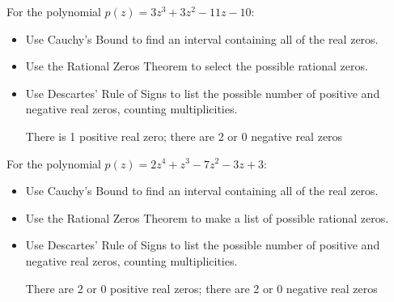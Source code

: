 \documentclass{ximera}
\begin{document}
\begin{problem}
For the polynomial $p(z) = 3z^{3} + 3z^{2} - 11z - 10$:

\begin{itemize}
\item  Use Cauchy's Bound to find an interval containing all of the real zeros.
\item  Use the Rational Zeros Theorem to select the possible rational zeros.
\begin{selectAll}
  \end{selectAll}
\item  Use Descartes' Rule of Signs to list the possible number of positive and negative real zeros, counting multiplicities.

\begin{solution}
    There is 1 positive real zero;  there are 2 or 0 negative real zeros
\end{solution}
\end{itemize}
\end{problem}

\begin{problem}\label{prelimpolystufflast}
For the polynomial $p(z) = 2z^4+z^3-7z^2-3z+3$:

\begin{itemize}
\item  Use Cauchy's Bound to find an interval containing all of the real zeros.
\item  Use the Rational Zeros Theorem to make a list of possible rational zeros.

\begin{selectAll}
  \end{selectAll}
  
  
\item  Use Descartes' Rule of Signs to list the possible number of positive and negative real zeros, counting multiplicities.

\begin{solution}
    There are 2 or 0 positive real zeros;  there are 2 or 0 negative real zeros
\end{solution}
\end{itemize}
\end{problem}
\end{document}
